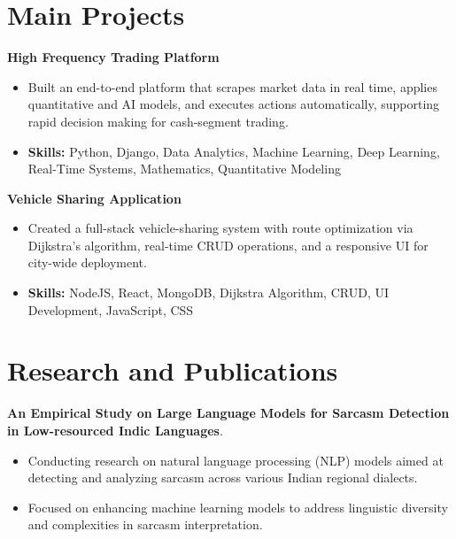 \documentclass[a4paper,11pt]{article}
\begin{document}
\section{\textbf{Main Projects}}

\vspace{1mm}
  \textbf{High Frequency Trading Platform  }
\vspace{-1.5mm} %
\begin{itemize}
  \item Built an end-to-end platform that scrapes market data in real time, applies quantitative and AI models, and executes actions automatically, supporting rapid decision making for cash-segment trading.
\vspace{-3mm}
  \item \textbf{Skills:} Python, Django, Data Analytics, Machine Learning, Deep Learning, Real-Time Systems, Mathematics, Quantitative Modeling
\end{itemize}


\vspace{1mm}
   \textbf{Vehicle Sharing Application }
\vspace{-1.5mm} %
\begin{itemize}
  \item Created a full-stack vehicle-sharing system with route optimization via Dijkstra's algorithm, real-time CRUD operations, and a responsive UI for city-wide deployment.
\vspace{-3mm}
  \item \textbf{Skills:} NodeJS, React, MongoDB, Dijkstra Algorithm, CRUD, UI Development, JavaScript, CSS
\end{itemize}



\section{\textbf{Research and Publications} \hfill }
\vspace{1mm}
  \textbf{An Empirical Study on Large Language Models for Sarcasm Detection in Low-resourced Indic Languages}.
\vspace{-1mm} %
\begin{itemize}
  \item Conducting research on natural language processing (NLP) models aimed at detecting and analyzing sarcasm across various Indian regional dialects.
\vspace{-3mm}
  \item Focused on enhancing machine learning models to address linguistic diversity and complexities in sarcasm interpretation.
\end{itemize}
\end{document}

